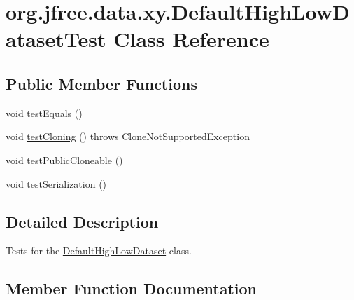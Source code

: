 \hypertarget{classorg_1_1jfree_1_1data_1_1xy_1_1_default_high_low_dataset_test}{}\section{org.\+jfree.\+data.\+xy.\+Default\+High\+Low\+Dataset\+Test Class Reference}
\label{classorg_1_1jfree_1_1data_1_1xy_1_1_default_high_low_dataset_test}
\subsection*{Public Member Functions}
\begin{DoxyCompactItemize}
\item 
void \mbox{\hyperlink{classorg_1_1jfree_1_1data_1_1xy_1_1_default_high_low_dataset_test_a3d6db93bb9d55aa0395c7f23545f434d}{test\+Equals}} ()
\item 
void \mbox{\hyperlink{classorg_1_1jfree_1_1data_1_1xy_1_1_default_high_low_dataset_test_a167c5315d01a5ca4f5ea5a1f55b85035}{test\+Cloning}} ()  throws Clone\+Not\+Supported\+Exception 
\item 
void \mbox{\hyperlink{classorg_1_1jfree_1_1data_1_1xy_1_1_default_high_low_dataset_test_aee4a78962cec3668fa488fab2ec5b129}{test\+Public\+Cloneable}} ()
\item 
void \mbox{\hyperlink{classorg_1_1jfree_1_1data_1_1xy_1_1_default_high_low_dataset_test_a77cc3e9cd748a37bd7bc019e09de2a7b}{test\+Serialization}} ()
\end{DoxyCompactItemize}


\subsection{Detailed Description}
Tests for the \mbox{\hyperlink{classorg_1_1jfree_1_1data_1_1xy_1_1_default_high_low_dataset}{Default\+High\+Low\+Dataset}} class. 

\subsection{Member Function Documentation}
\mbox{\label{classorg_1_1jfree_1_1data_1_1xy_1_1_default_high_low_dataset_test_a167c5315d01a5ca4f5ea5a1f55b85035}} 

